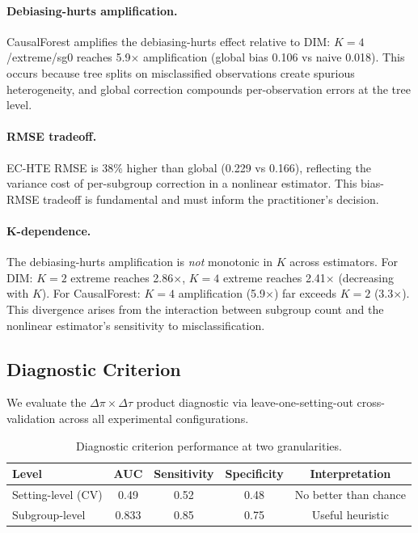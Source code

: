 \documentclass[11pt,a4paper]{article}
\newcommand{\DeltaPi}{\Delta\pi}
\newcommand{\DeltaTau}{\Delta\tau}
\begin{document}
\paragraph{Debiasing-hurts amplification.}
CausalForest amplifies the debiasing-hurts effect relative to DIM: $K=4$/extreme/sg0 reaches 5.9$\times$ amplification (global bias 0.106 vs naive 0.018).
This occurs because tree splits on misclassified observations create spurious heterogeneity, and global correction compounds per-observation errors at the tree level.

\paragraph{RMSE tradeoff.}
EC-HTE RMSE is 38\% higher than global (0.229 vs 0.166), reflecting the variance cost of per-subgroup correction in a nonlinear estimator.
This bias-RMSE tradeoff is fundamental and must inform the practitioner's decision.

\paragraph{K-dependence.}
The debiasing-hurts amplification is \emph{not} monotonic in $K$ across estimators.
For DIM: $K=2$ extreme reaches 2.86$\times$, $K=4$ extreme reaches 2.41$\times$ (decreasing with $K$).
For CausalForest: $K=4$ amplification (5.9$\times$) far exceeds $K=2$ (3.3$\times$).
This divergence arises from the interaction between subgroup count and the nonlinear estimator's sensitivity to misclassification.


\subsection{Diagnostic Criterion}\label{sec:diagnostic_exp}

We evaluate the $\DeltaPi \times \DeltaTau$ product diagnostic via leave-one-setting-out cross-validation across all experimental configurations.

\begin{table}[t]
\centering
\small
\caption{Diagnostic criterion performance at two granularities.}
\label{tab:diagnostic}
\begin{tabular}{@{}lcccc@{}}
\toprule
Level & AUC & Sensitivity & Specificity & Interpretation \\
\midrule
Setting-level (CV) & 0.49 & 0.52 & 0.48 & No better than chance \\
Subgroup-level & 0.833 & 0.85 & 0.75 & Useful heuristic \\
\bottomrule
\end{tabular}
\end{table}
\end{document}
